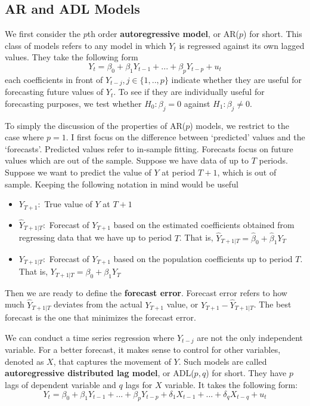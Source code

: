 \documentclass[12pt]{article}
\theoremstyle{definition}
\theoremstyle{property}
\theoremstyle{assumption}
\theoremstyle{example}
\theoremstyle{comment}
\begin{document}
\subsection{AR and ADL Models}
We first consider the $p$th order \textbf{autoregressive model}, or AR($p$) for short. This class of models refers to any model in which $Y_t$ is regressed against its own lagged values. They take the following form
\[
Y_t = \beta_0+\beta_1Y_{t-1}+...+\beta_pY_{t-p}+u_t \tag{2}
\]
each coefficients in front of $Y_{t-j}, j\in\{1,..,p\}$ indicate whether they are useful for forecasting future values of $Y_t$. To see if they are individually useful for forecasting purposes, we test whether $H_0:\beta_j=0$ against $H_1:\beta_j\neq0$.
\par\medskip
To simply the discussion of the properties of AR($p$) models, we restrict to the case where $p=1$. I first focus on the difference between `predicted' values and the `forecasts'. Predicted values refer to in-sample fitting. Forecasts focus on future values which are out of the sample. Suppose we have data of up to $T$ periods. Suppose we want to predict the value of $Y$ at period $T+1$, which is out of sample. Keeping the following notation in mind would be useful
\begin{itemize}
\item $Y_{T+1}: $ True value of $Y$ at $T+1$
\item $\hat{Y}_{T+1|T}: $ Forecast of $Y_{T+1}$ based on the estimated coefficients obtained from regressing data that we have up to period $T$. That is, $\hat{Y}_{T+1|T}=\hat{\beta}_0+\hat{\beta}_1Y_T$
\item $Y_{T+1|T}: $ Forecast of $Y_{T+1}$ based on the population coefficients up to period $T$. That is, $Y_{T+1|T}=\beta_0+\beta_1Y_T$
\end{itemize}
Then we are ready to define the \textbf{forecast error}. Forecast error refers to how much $\hat{Y}_{T+1|T}$ deviates from the actual $Y_{T+1}$ value, or $Y_{T+1}-\hat{Y}_{T+1|T}$. The best forecast is the one that minimizes the forecast error. 
\par\medskip
We can conduct a time series regression where $Y_{t-j}$ are not the only independent variable. For a better forecast, it makes sense to control for other variables, denoted as $X$, that captures the movement of $Y$. Such models are called \textbf{autoregressive distributed lag model}, or ADL($p,q$) for short. They have $p$ lags of dependent variable and $q$ lags for $X$ variable. It takes the following form:
\[
Y_t = \beta_0+\beta_1Y_{t-1}+...+\beta_p Y_{t-p} + \delta_1 X_{t-1}+...+\delta_qX_{t-q}+u_t \tag{3}
\]
\end{document}
